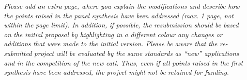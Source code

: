 %

\emph{Please add an extra page, where you explain the modifications and describe
  how the points raised in the panel synthesis have been addressed (max. 1 page,
  not within the page limit). In addition, if possible, the resubmission should
  be based on the initial proposal by highlighting in a different colour any
  changes or additions that were made to the initial version. Please be aware
  that the re-submitted project will be evaluated by the same standards as “new”
  applications and in the competition of the new call. Thus, even if all points
  raised in the first synthesis have been addressed, the project might not be
  retained for funding.
}


%
